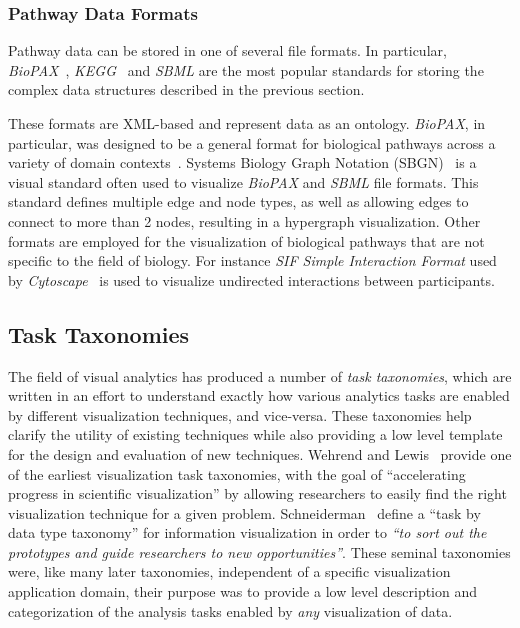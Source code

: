\documentclass[journal]{vgtc}                %
\begin{document}
\subsubsection{Pathway Data Formats}
Pathway data can be stored in one of several file formats.
In particular, \textit{BioPAX}~\cite{demir2010biopax}, \textit{KEGG}~\cite{kanehisa2000kegg} and \textit{SBML} \cite{Hucka2003} are the most popular standards for storing the complex data structures described in the previous section.

These formats are XML-based and represent data as an ontology.
\emph{BioPAX}, in particular, was designed to be a general format for biological pathways across a variety of domain contexts~\cite{demir2010biopax}.
Systems Biology Graph Notation (SBGN)~\cite{Novere2009} is a visual standard often used to visualize \textit{BioPAX} and \textit{SBML} file formats.
This standard defines multiple edge and node types, as well as allowing edges to connect to more than 2 nodes, resulting in a hypergraph visualization.
Other formats are employed for the visualization of biological pathways that are not specific to the field of biology.
For instance \textit{SIF Simple Interaction Format} used by \textit{Cytoscape}~\cite{Shannon2003cytoscape} is used to visualize undirected interactions between participants.




\subsection{Task Taxonomies}
The field of visual analytics has produced a number of \textit{task taxonomies}, which are written in an effort to understand exactly how various analytics tasks are enabled by different visualization techniques, and vice-versa.
These taxonomies help clarify the utility of existing techniques while also providing a low level template for the design and evaluation of new techniques.
Wehrend and Lewis~\cite{Wehrend1990} provide one of the earliest visualization task taxonomies, with the goal of ``accelerating progress in scientific visualization'' by allowing researchers to easily find the right visualization technique for a given problem.
Schneiderman~\cite{Shneiderman1996} define a ``task by data type taxonomy'' for information visualization in order to \textit{``to sort out the prototypes and guide researchers to new opportunities''}.
These seminal taxonomies were, like many later taxonomies, independent of a specific visualization application domain, their purpose was to provide a low level description and categorization of the analysis tasks enabled by \textit{any} visualization of data.
\end{document}
